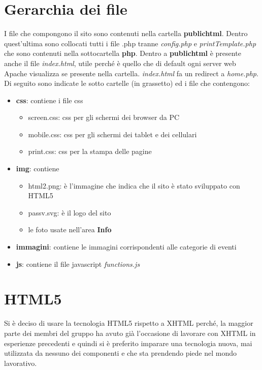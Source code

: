 \documentclass[10pt, a4paper]{article}
\begin{document}
\section{Gerarchia dei file}
I file che compongono il sito sono contenuti nella cartella \textbf{public\textunderscore html}.
Dentro quest'ultima sono collocati tutti i file .php tranne \emph{config.php} e \emph{printTemplate.php}
che sono contenuti nella sottocartella \textbf{php}. Dentro a \textbf{public\textunderscore html} è presente
anche il file \emph{index.html}, utile perché è quello che di default ogni server web Apache visualizza se presente
nella cartella. \emph{index.html} fa un redirect a \emph{home.php}.
Di seguito sono indicate le sotto cartelle (in grassetto) ed i file che contengono:
\begin{itemize}
  \item{\textbf{css}: contiene i file css}
    \begin{itemize}
      \item{screen.css: css per gli schermi dei browser da PC}
      \item{mobile.css: css per gli schermi dei tablet e dei cellulari}
      \item{print.css: css per la stampa delle pagine}
    \end{itemize}
  \item{\textbf{img}: contiene}
    \begin{itemize}
		\item{html2.png: è l'immagine che indica che il sito è stato sviluppato con HTML5}
        \item{passv.svg: è il logo del sito}
        \item{le foto usate nell'area \textbf{\textcolor{UniPD}{Info}}}
    \end{itemize}
  \item{\textbf{immagini}: contiene le immagini corrispondenti alle categorie di eventi}
  \item{\textbf{js}: contiene il file javascript \emph{functions.js}}
\end{itemize}
\section{HTML5} \label{sec:html5}
Si è deciso di usare la tecnologia HTML5 rispetto a XHTML perché, la 
maggior parte dei membri del gruppo ha avuto già l'occasione di lavorare con XHTML
in esperienze precedenti e quindi si è preferito imparare una tecnologia nuova, mai
utilizzata da nessuno dei componenti e che sta prendendo 
piede nel mondo lavorativo. 
\end{document}
